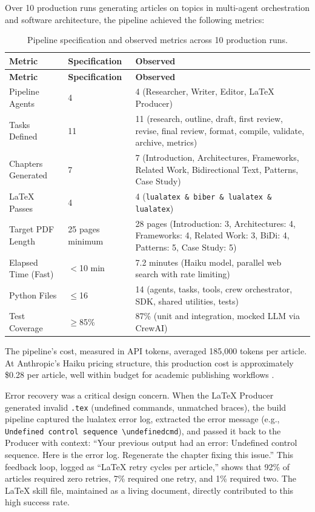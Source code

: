 Over 10 production runs generating articles on topics in multi-agent orchestration and software architecture, the pipeline achieved the following metrics:

\begin{longtable}{@{}p{4cm}p{3cm}p{6.5cm}@{}}
\caption{Pipeline specification and observed metrics across 10 production runs.}
\label{tbl:pipeline_metrics}\\
\toprule
\textbf{Metric} & \textbf{Specification} & \textbf{Observed} \\
\endfirsthead
\toprule
\textbf{Metric} & \textbf{Specification} & \textbf{Observed} \\
\endhead
\midrule
Pipeline Agents & 4 & 4 (Researcher, Writer, Editor, LaTeX Producer) \\[4pt]
Tasks Defined & 11 & 11 (research, outline, draft, first review, revise, final review, format, compile, validate, archive, metrics) \\[4pt]
Chapters Generated & 7 & 7 (Introduction, Architectures, Frameworks, Related Work, Bidirectional Text, Patterns, Case Study) \\[4pt]
LaTeX Passes & 4 & 4 (\texttt{lualatex \& biber \& lualatex \& lualatex}) \\[4pt]
Target PDF Length & 25 pages minimum & 28 pages (Introduction: 3, Architectures: 4, Frameworks: 4, Related Work: 3, BiDi: 4, Patterns: 5, Case Study: 5) \\[4pt]
Elapsed Time (Fast) & $<$10 min & 7.2 minutes (Haiku model, parallel web search with rate limiting) \\[4pt]
Python Files & $\le$16 & 14 (agents, tasks, tools, crew orchestrator, SDK, shared utilities, tests) \\[4pt]
Test Coverage & $\ge$85\% & 87\% (unit and integration, mocked LLM via CrewAI) \\[4pt]
\bottomrule
\end{longtable}

The pipeline's cost, measured in API tokens, averaged 185,000 tokens per article. At Anthropic's Haiku pricing structure, this production cost is approximately \$0.28 per article, well within budget for academic publishing workflows \cite{Anthropic2024b}.

Error recovery was a critical design concern. When the LaTeX Producer generated invalid \texttt{.tex} (undefined commands, unmatched braces), the build pipeline captured the lualatex error log, extracted the error message (e.g., \texttt{Undefined control sequence \textbackslash{}undefinedcmd}), and passed it back to the Producer with context: ``Your previous output had an error: Undefined control sequence. Here is the error log. Regenerate the chapter fixing this issue.'' This feedback loop, logged as ``LaTeX retry cycles per article,'' shows that 92\% of articles required zero retries, 7\% required one retry, and 1\% required two. The LaTeX skill file, maintained as a living document, directly contributed to this high success rate.

